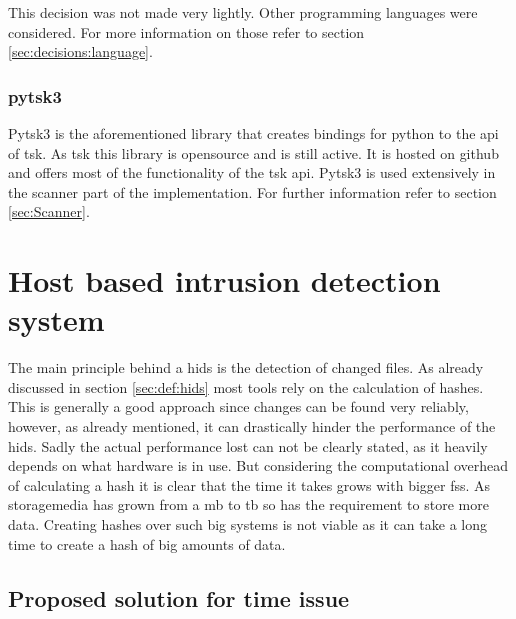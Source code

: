 \documentclass[
	a4paper,					%
	10pt,							%
	twoside,					%
	openright,				%
	notitlepage,			%
	parskip=half,			%
]{scrreprt}					%
\begin{document}
This decision was not made very lightly. Other programming languages were considered. For more information on those refer to section \ref{sec:decisions:language}.

\subsubsection{pytsk3}
\label{sec:pytsk3}

Pytsk3 is the aforementioned library that creates bindings for python to the \gls{api} of \gls{tsk}. As \gls{tsk} this library is \gls{opensource} and is still active. It is hosted on \gls{github} and offers most of the functionality of the \gls{tsk} \gls{api}. Pytsk3 is used extensively in the scanner part of the implementation. For further information refer to section \ref{sec:Scanner}.

\section{Host based intrusion detection system}
\label{sec:hids}

The main principle behind a \gls{hids} is the detection of changed files. As already discussed in section \ref{sec:def:hids} most tools rely on the calculation of hashes. This is generally a good approach since changes can be found very reliably, however, as already mentioned, it can drastically hinder the performance of the \gls{hids}. Sadly the actual performance lost can not be clearly stated, as it heavily depends on what hardware is in use. But considering the computational overhead of calculating a \gls{hash} it is clear that the time it takes grows with bigger \glspl{fs}. As \gls{storagemedia} has grown from a \gls{mb} to \gls{tb} so has the requirement to store more data. Creating hashes over such big systems is not viable as it can take a long time to create a hash of big amounts of data. \cite{hash:slow, hash:veryslow, hash:speed}

\subsection{Proposed solution for time issue}
\end{document}
